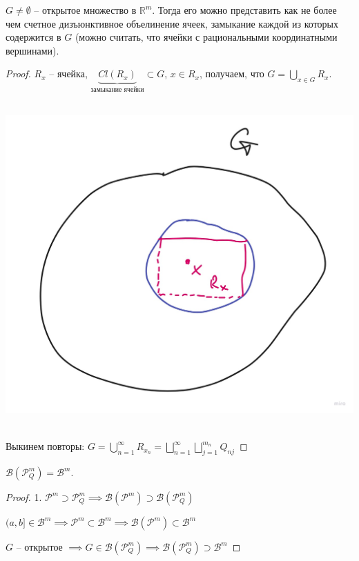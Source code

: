 \begin{theorem}
    $G \neq \emptyset$ -- открытое множество в $\mathbb{R}^m$. Тогда его можно представить как не более чем счетное дизъюнктивное объелинение ячеек, замыкание каждой из которых содержится в $G$ (можно считать, что ячейки с рациональными координатными вершинами).
\end{theorem}
\begin{proof}

    $R_x$ -- ячейка, $\underbrace{Cl  (R_x)}_{\text{замыкание ячейки}} \subset G$, $x \in R_x$, получаем, что $G = \bigcup_{x \in G} R_x$.

    \hbox{
        \includegraphics[scale=0.15]{./assets/01-measure-theory/opened-set-with-rect.jpg}
    }

    Выкинем повторы: $G = \bigcup_{n=1}^{\infty} R_{x_n} = \bigsqcup_{n=1}^{\infty} \bigsqcup_{j=1}^{m_n} Q_{nj}$
\end{proof}

\begin{consequence}
    $\mathcal{B}(\mathcal{P}^m_Q) = \mathcal{B}^m$.
\end{consequence}
\begin{proof}
    
    1. $\mathcal{P}^m \supset \mathcal{P}^m_Q \implies \mathcal{B}(\mathcal{P}^m) \supset \mathcal{B}(\mathcal{P}_Q^m)$

    $(a, b] \in \mathcal{B}^m \implies \mathcal{P}^m \subset \mathcal{B}^m \implies \mathcal{B}(\mathcal{P}^m) \subset \mathcal{B}^m$

    $G$ -- открытое $\implies G \in \mathcal{B}(\mathcal{P}_Q^m) \implies \mathcal{B}(\mathcal{P}^m_Q) \supset \mathcal{B}^m$
\end{proof}

